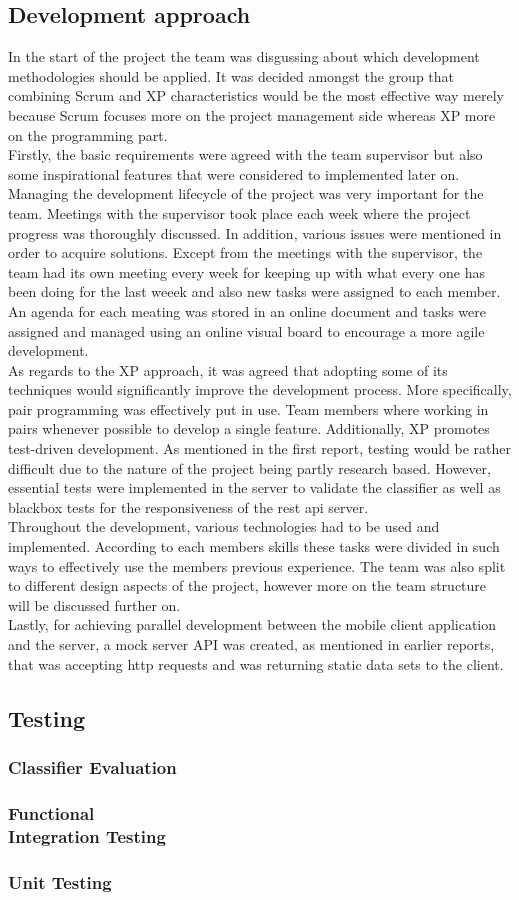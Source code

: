 \subsection{Development approach} In the start of the project the team was disgussing about which 
development methodologies should be applied. It was decided amongst the group that combining Scrum 
and XP characteristics would be the most effective way merely because Scrum focuses more on the 
project management side whereas XP more on the programming part.\\ 
Firstly, the basic requirements were agreed with the team supervisor but also some inspirational 
features that were considered to implemented later on. Managing the development lifecycle of the 
project was very important for the team. Meetings with the supervisor took place each week where the 
project progress was thoroughly discussed. In addition, various issues were mentioned in order to 
acquire solutions. Except from the meetings with the supervisor, the team had its own meeting every 
week for keeping up with what every one has been doing for the last weeek and also new tasks were 
assigned to each member. An agenda for each meating was stored in an online document and tasks were 
assigned and managed using an online visual board to encourage a more agile development.\\ 
As regards to the XP approach, it was agreed that adopting some of its techniques would 
significantly improve the development process. More specifically, pair programming was effectively 
put in use. Team members where working in pairs whenever possible to develop a single feature. 
Additionally, XP promotes test-driven development. As mentioned in the first report, testing would 
be rather difficult due to the nature of the project being partly research based. However, essential 
tests were implemented in the server to validate the classifier as well as blackbox tests for the 
responsiveness of the rest api server. \\
Throughout the development, various technologies had to be 
used and implemented. According to each members skills these tasks were divided in such ways to 
effectively use the members previous experience. The team was also split to different design aspects 
of the project, however more on the team structure will be discussed further on.\\ 
Lastly, for achieving parallel development between the mobile client application and the server, a 
mock server API was created, as mentioned in earlier reports, that was accepting http requests and 
was returning static data sets to the client. 

\subsection{Testing} 
\subsubsection{Classifier Evaluation} 
\subsubsection{Functional\\Integration Testing} 
\subsubsection{Unit Testing} 

